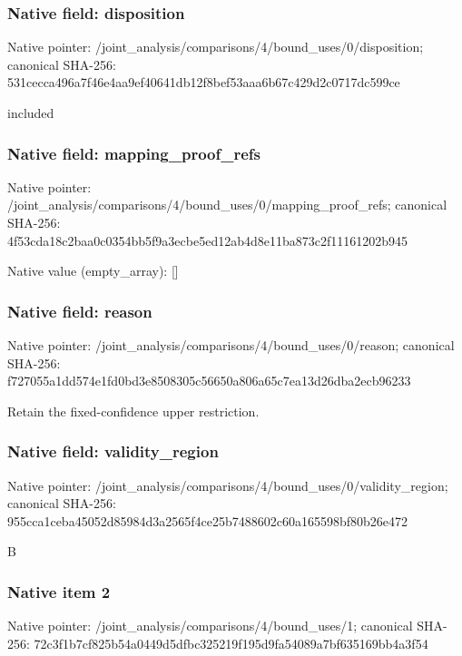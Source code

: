 \documentclass[10pt,a4paper]{article}
\begin{document}
\subsubsection{Native field: disposition}
Native pointer: /joint\_\allowbreak{}analysis/comparisons/4/bound\_\allowbreak{}uses/0/disposition; canonical SHA-256: 531cecca496a7f46e4aa9ef40641db12f8bef53aaa6b67c429d2c0717dc599ce

\begingroup\raggedright\sloppy included\par\endgroup

\subsubsection{Native field: mapping\_\allowbreak{}proof\_\allowbreak{}refs}
Native pointer: /joint\_\allowbreak{}analysis/comparisons/4/bound\_\allowbreak{}uses/0/mapping\_\allowbreak{}proof\_\allowbreak{}refs; canonical SHA-256: 4f53cda18c2baa0c0354bb5f9a3ecbe5ed12ab4d8e11ba873c2f11161202b945

Native value (empty\_\allowbreak{}array): []

\subsubsection{Native field: reason}
Native pointer: /joint\_\allowbreak{}analysis/comparisons/4/bound\_\allowbreak{}uses/0/reason; canonical SHA-256: f727055a1dd574e1fd0bd3e8508305c56650a806a65c7ea13d26dba2ecb96233

\begingroup\raggedright\sloppy Retain the fixed-confidence upper restriction.\par\endgroup

\subsubsection{Native field: validity\_\allowbreak{}region}
Native pointer: /joint\_\allowbreak{}analysis/comparisons/4/bound\_\allowbreak{}uses/0/validity\_\allowbreak{}region; canonical SHA-256: 955cca1ceba45052d85984d3a2565f4ce25b7488602c60a165598bf80b26e472

\begingroup\raggedright\sloppy B\par\endgroup

\subsubsection{Native item 2}
Native pointer: /joint\_\allowbreak{}analysis/comparisons/4/bound\_\allowbreak{}uses/1; canonical SHA-256: 72c3f1b7cf825b54a0449d5dfbc325219f195d9fa54089a7bf635169bb4a3f54
\end{document}
